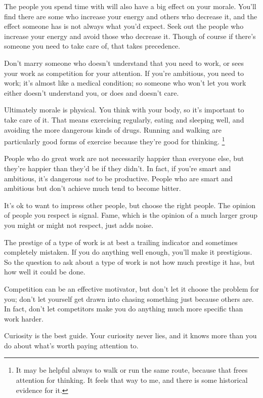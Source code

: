 The people you spend time with will also have a big effect on your
morale. You'll find there are some who increase your energy and others
who decrease it, and the effect someone has is not always what you'd
expect. Seek out the people who increase your energy and avoid those who
decrease it. Though of course if there's someone you need to take care
of, that takes precedence.

Don't marry someone who doesn't understand that you need to work, or
sees your work as competition for your attention. If you're ambitious,
you need to work; it's almost like a medical condition; so someone who
won't let you work either doesn't understand you, or does and doesn't
care.

Ultimately morale is physical. You think with your body, so it's
important to take care of it. That means exercising regularly, eating
and sleeping well, and avoiding the more dangerous kinds of drugs.
Running and walking are particularly good forms of exercise because
they're good for thinking. \footnote{It may be helpful always to walk or run the same route, because
that frees attention for thinking. It feels that way to me, and there is
some historical evidence for it.}

People who do great work are not necessarily happier than everyone else,
but they're happier than they'd be if they didn't. In fact, if you're
smart and ambitious, it's dangerous \emph{not} to be productive. People
who are smart and ambitious but don't achieve much tend to become
bitter.

It's ok to want to impress other people, but choose the right people.
The opinion of people you respect is signal. Fame, which is the opinion
of a much larger group you might or might not respect, just adds noise.

The prestige of a type of work is at best a trailing indicator and
sometimes completely mistaken. If you do anything well enough, you'll
make it prestigious. So the question to ask about a type of work is not
how much prestige it has, but how well it could be done.

Competition can be an effective motivator, but don't let it choose the
problem for you; don't let yourself get drawn into chasing something
just because others are. In fact, don't let competitors make you do
anything much more specific than work harder.

Curiosity is the best guide. Your curiosity never lies, and it knows
more than you do about what's worth paying attention to.

